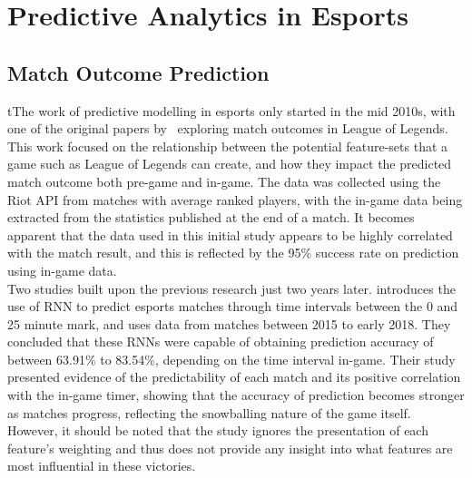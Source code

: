 \section{Predictive Analytics in Esports}\label{sec:PredictiveAnalyticsinEsports}
\subsection{Match Outcome Prediction}\label{subsec:Match Outcome Prediction}
tThe work of predictive modelling in esports only started in the mid 2010s, with one of the original papers by~\citet{lin2016league} exploring match outcomes in League of Legends.
This work focused on the relationship between the potential feature-sets that a game such as League of Legends can create, and how they impact the predicted match outcome both pre-game and in-game.
The data was collected using the Riot API from matches with average ranked players, with the in-game data being extracted from the statistics published at the end of a match.
It becomes apparent that the data used in this initial study appears to be highly correlated with the match result, and this is reflected by the 95\% success rate on prediction using in-game data. \\

Two studies built upon the previous research just two years later.
\citet{silva2018continuous} introduces the use of \ac{RNN} to predict esports matches through time intervals between the 0 and 25 minute mark, and uses data from matches between 2015 to early 2018.
They concluded that these \ac{RNN}s were capable of obtaining prediction accuracy of between 63.91\% to 83.54\%, depending on the time interval in-game.
Their study presented evidence of the predictability of each match and its positive correlation with the in-game timer, showing that the accuracy of prediction becomes stronger as matches progress, reflecting the snowballing nature of the game itself.
However, it should be noted that the study ignores the presentation of each feature's weighting and thus does not provide any insight into what features are most influential in these victories. \\

